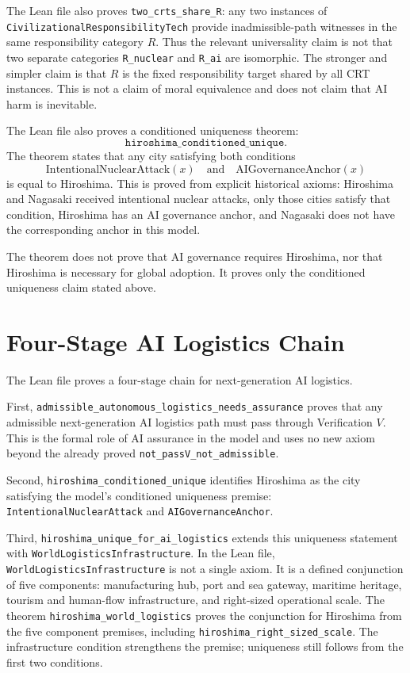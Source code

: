 \documentclass[11pt]{article}
\begin{document}
The Lean file also proves \texttt{two\_crts\_share\_R}: any two instances of
\texttt{CivilizationalResponsibilityTech} provide inadmissible-path witnesses
in the same responsibility category $R$.  Thus the relevant universality claim
is not that two separate categories \texttt{R\_nuclear} and \texttt{R\_ai} are
isomorphic.  The stronger and simpler claim is that $R$ is the fixed
responsibility target shared by all CRT instances.  This is not a claim of
moral equivalence and does not claim that AI harm is inevitable.

The Lean file also proves a conditioned uniqueness theorem:
\[
\texttt{hiroshima\_conditioned\_unique}.
\]
The theorem states that any city satisfying both conditions
\[
\text{IntentionalNuclearAttack}(x)
\quad\text{and}\quad
\text{AIGovernanceAnchor}(x)
\]
is equal to Hiroshima.  This is proved from explicit historical axioms:
Hiroshima and Nagasaki received intentional nuclear attacks, only those cities
satisfy that condition, Hiroshima has an AI governance anchor, and Nagasaki
does not have the corresponding anchor in this model.

The theorem does not prove that AI governance requires Hiroshima, nor that
Hiroshima is necessary for global adoption.  It proves only the conditioned
uniqueness claim stated above.

\section*{Four-Stage AI Logistics Chain}

The Lean file proves a four-stage chain for next-generation AI logistics.

First, \texttt{admissible\_autonomous\_logistics\_needs\_assurance} proves that
any admissible next-generation AI logistics path must pass through
Verification $V$.  This is the formal role of AI assurance in the model and
uses no new axiom beyond the already proved
\texttt{not\_passV\_not\_admissible}.

Second, \texttt{hiroshima\_conditioned\_unique} identifies Hiroshima as the
city satisfying the model's conditioned uniqueness premise:
\texttt{IntentionalNuclearAttack} and \texttt{AIGovernanceAnchor}.

Third, \texttt{hiroshima\_unique\_for\_ai\_logistics} extends this uniqueness
statement with \texttt{WorldLogisticsInfrastructure}.  In the Lean file,
\texttt{WorldLogisticsInfrastructure} is not a single axiom.  It is a defined
conjunction of five components: manufacturing hub, port and sea gateway,
maritime heritage, tourism and human-flow infrastructure, and right-sized
operational scale.  The theorem \texttt{hiroshima\_world\_logistics} proves the
conjunction for Hiroshima from the five component premises, including
\texttt{hiroshima\_right\_sized\_scale}.  The infrastructure condition
strengthens the premise; uniqueness still follows from the first two
conditions.
\end{document}
